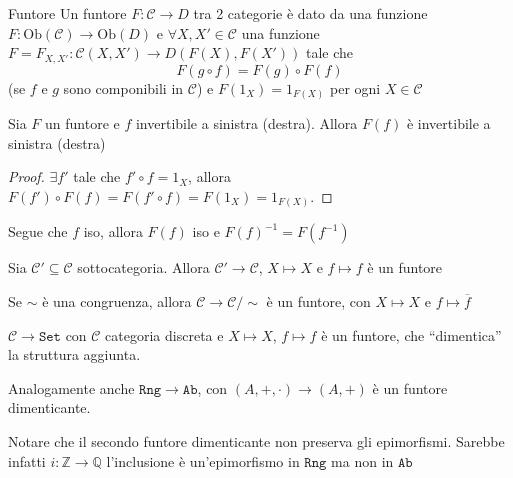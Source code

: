 \begin{definition}{Funtore}
    Un funtore \(F : \mathcal{C} \to D\) tra 2 categorie è dato da una funzione
    \(F : \mathrm{Ob}{(\mathcal{C})} \to \mathrm{Ob}{(D)}\) e \(\forall X, X' \in \mathcal{C}\) una
    funzione \(F = F_{X, X'} : \mathcal{C}{(X, X')} \to D{(F{(X)}, F{(X')})}\) tale che
    \[
      F{(g\circ f)} = F{(g)}\circ F{(f)} 
    \]
    (se \(f\) e \(g\) sono componibili in \(\mathcal{C}\)) e \(F{(1_X)} = 1_{F{(X)}} \)
    per ogni \(X \in \mathcal{C}\) 
    
\end{definition}
\begin{proposition}{}
    Sia \(F\) un funtore e \(f\) invertibile a sinistra (destra). Allora \(F{(f)}\) è invertibile a sinistra (destra)
\end{proposition}
\begin{proof}{}
    \(\exists f'\) tale che \(f' \circ f = 1_X\), allora \(F{(f')} \circ F{(f)} = F{(f'\circ f)} = F{(1_X)} = 1_{F{(X)}} \).
\end{proof}
\begin{remark}{}
    Segue che \(f\) iso, allora \(F{(f)}\) iso e \(F{(f)}^{-1} = F{(f^{-1})}\) 
\end{remark}

\begin{example}{}
    Sia \(\mathcal{C}' \subseteq \mathcal{C} \) sottocategoria. Allora \(\mathcal{C}' \to \mathcal{C}\), \(X \mapsto X\) e \(f \mapsto f\) è un funtore
\end{example}

\begin{example}{}
    Se \(\sim \) è una congruenza, allora \(\mathcal{C} \to \mathcal{C} /\sim\) è un funtore, con
    \(X \mapsto X\) e \(f \mapsto \overline{f}\) 
\end{example}

\begin{example}
    \(\mathcal{C} \to \mathtt{Set}\) con \(\mathcal{C}\) categoria discreta e \(X \mapsto X\), \(f
    \mapsto f\) è un funtore, che ``dimentica'' la struttura aggiunta.

    Analogamente anche \(\mathtt{Rng} \to \mathtt{Ab}\), con \({(A, +, \cdot )} \to {(A, +)}\) è un funtore dimenticante.
\end{example}
\begin{remark}{}
    Notare che il secondo funtore dimenticante non preserva gli epimorfismi.
    Sarebbe infatti \(i : \mathbb{Z} \to \mathbb{Q}\) l'inclusione è
    un'epimorfismo in \(\mathtt{Rng}\) ma non in \(\mathtt{Ab}\) 
\end{remark}


